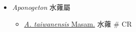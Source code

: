 
  \begin{itemize}
 \item[] \textit{Aponogeton} 水蕹屬
                                
  \begin{itemize}
        \item[] \href{http://www.theplantlist.org/tpl1.1/search?q=Aponogeton+taiwanensis}{\textit{A. taiwanensis} Masam.}   水蕹  \# CR
  \end{itemize}
  \end{itemize}
